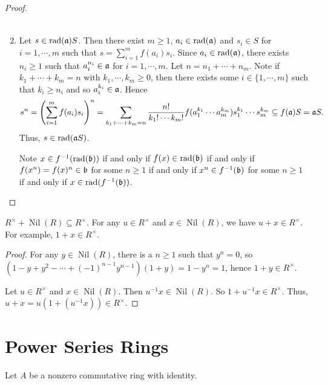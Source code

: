 \begin{proof}
\begin{enumerate}
\begin{align*}
            \end{align*}
        \item 
            Let $s \in \operatorname{rad}(\mathfrak{a})S$. Then there exist $m \geq 1$, $a_i \in \operatorname{rad}(\mathfrak{a})$ and $s_i \in S$ for $i = 1,\cdots,m$ such that $s = \sum_{i=1}^m f(a_i)s_i$. Since $a_i \in \operatorname{rad}(\mathfrak{a})$, there exists $n_i \geq 1$ such that $a_i^{n_i} \in \mathfrak{a}$ for $i = 1,\cdots,m$. Let $n = n_1 + \cdots + n_m$. Note if $k_1 + \cdots + k_m = n$ with $k_1,\cdots,k_m \geq 0$, then there exists some $i \in \{1,\cdots,m\}$ such that $k_i \geq n_i$ and so $a_i^{k_i} \in \mathfrak{a}$. Hence  
            \[s^n = \left(\sum_{i=1}^m f(a_i)s_i\right)^n = \sum_{k_1 + \cdots + k_m = n} \frac{n!}{k_1! \cdots k_m!} f(a_1^{k_1} \cdots a_m^{k_m}) s_1^{k_1} \cdots s_m^{k_m} \subseteq f(\mathfrak{a})S = \mathfrak{a} S.\]
            Thus, $s \in \operatorname{rad}(\mathfrak{a} S)$. \par
            Note $x \in f^{-1}(\operatorname{rad}(\mathfrak{b}))$ if and only if $f(x) \in \operatorname{rad}(\mathfrak{b})$ if and only if $f(x^n) = f(x)^n \in \mathfrak{b}$ for some $n \geq 1$ if and only if $x^n  \in f^{-1}(\mathfrak{b})$ for some $n \geq 1$ if and only if $x \in \operatorname{rad}(f^{-1}(\mathfrak{b}))$. \qedhere
    \end{enumerate}
\end{proof}

\begin{proposition}\label{1.64}
    $R^\times + \operatorname{Nil}(R) \subseteq R^\times$. For any $u \in R^\times$ and $x \in \operatorname{Nil}(R)$, we have $u+x \in R^\times$. For example, $1+x \in R^\times$.
\end{proposition}

\begin{proof}
    For any $y \in \operatorname{Nil}(R)$, there is a $n \geq 1$ such that $y^n = 0$, so $(1-y+y^2-\cdots+(-1)^{n-1}y^{n-1})(1+y) = 1-y^n = 1$, hence $1+y \in R^\times$. \par 
    Let $u \in R^\times$ and $x \in \operatorname{Nil}(R)$. Then $u^{-1}x \in \operatorname{Nil}(R)$. So $1+u^{-1}x \in R^\times$. Thus, $u + x = u(1+(u^{-1}x)) \in R^\times$. 
\end{proof}

\section*{Power Series Rings}

Let $A$ be a nonzero commutative ring with identity.

